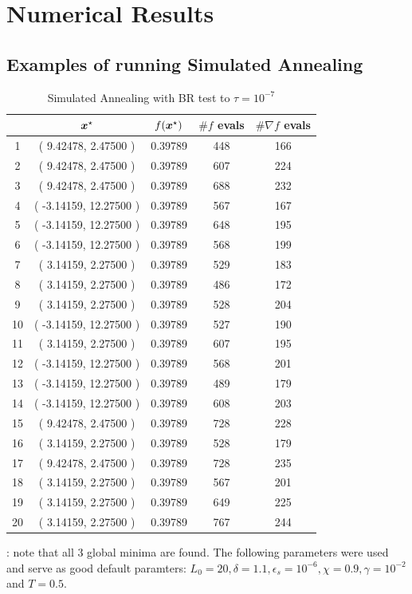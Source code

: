 \section{Numerical Results}
\label{sec:experiments}

\subsection{Examples of running Simulated Annealing}

\begin{table}[h]
    \center
    \caption{Simulated Annealing with BR test to $\tau=10^{-7}$}
    \label{table:run_example}
    \footnotesize
    \begin{tabular}{c|cc|cc}
& $\boldsymbol{x}^\star$ & $f(\boldsymbol{x}^\star)$ & $\# f$ evals & $\# \nabla f$ evals \\
\hline
1 & ( 9.42478, 2.47500 ) & 0.39789 & 448 & 166 \\
2 & ( 9.42478, 2.47500 ) & 0.39789 & 607 & 224 \\
3 & ( 9.42478, 2.47500 ) & 0.39789 & 688 & 232 \\
4 & ( -3.14159, 12.27500 ) & 0.39789 & 567 & 167 \\
5 & ( -3.14159, 12.27500 ) & 0.39789 & 648 & 195 \\
6 & ( -3.14159, 12.27500 ) & 0.39789 & 568 & 199 \\
7 & ( 3.14159, 2.27500 ) & 0.39789 & 529 & 183 \\
8 & ( 3.14159, 2.27500 ) & 0.39789 & 486 & 172 \\
9 & ( 3.14159, 2.27500 ) & 0.39789 & 528 & 204 \\
10 & ( -3.14159, 12.27500 ) & 0.39789 & 527 & 190 \\
11 & ( 3.14159, 2.27500 ) & 0.39789 & 607 & 195 \\
12 & ( -3.14159, 12.27500 ) & 0.39789 & 568 & 201 \\
13 & ( -3.14159, 12.27500 ) & 0.39789 & 489 & 179 \\
14 & ( -3.14159, 12.27500 ) & 0.39789 & 608 & 203 \\
15 & ( 9.42478, 2.47500 ) & 0.39789 & 728 & 228 \\
16 & ( 3.14159, 2.27500 ) & 0.39789 & 528 & 179 \\
17 & ( 9.42478, 2.47500 ) & 0.39789 & 728 & 235 \\
18 & ( 3.14159, 2.27500 ) & 0.39789 & 567 & 201 \\
19 & ( 3.14159, 2.27500 ) & 0.39789 & 649 & 225 \\
20 & ( 3.14159, 2.27500 ) & 0.39789 & 767 & 244 \\
    \end{tabular}
    
    \vspace{10pt}

    : note that all 3 global minima are found. The following parameters were used and serve as good
    default paramters: $L_0 = 20, \delta=1.1, \epsilon_s = 10^{-6}, \chi=0.9, \gamma=10^{-2}$ and
    $T=0.5$.
\end{table}

